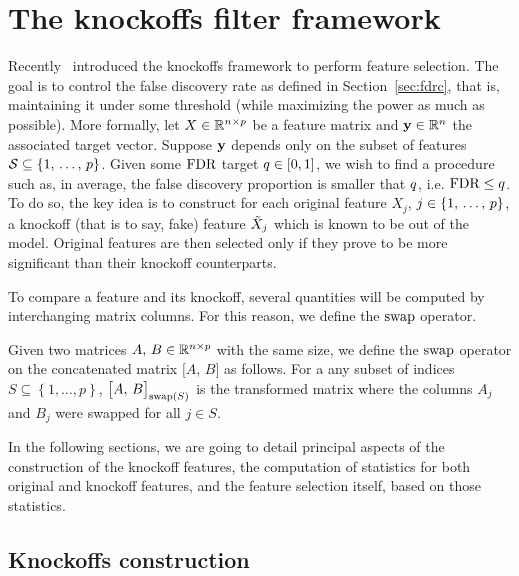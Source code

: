 \chapter{The knockoffs filter framework}\label{ch:knockoffs}

Recently~\cite{fixed_x_knockoffs} introduced the knockoffs framework to perform feature selection.
The goal is to control the false discovery rate as defined in Section~\ref{sec:fdrc},
that is, maintaining it under some threshold
(while maximizing the power as much as possible).
More formally, let $X \in \mathbb{R}^{n \times p}$ be a feature matrix and $\mathbf{y} \in \mathbb{R}^n$ the associated target vector.
Suppose $\mathbf{y}$ depends only on the subset of features $\mathcal{S} \subseteq \left\{ 1,\, \dots,\, p \right\}$.
Given some $\text{FDR}$ target $q \in [0, 1]$, we wish to find a procedure such as, in average,
the false discovery proportion is smaller that $q$, i.e. $\text{FDR} \leq q$.
To do so, the key idea is to construct for each original feature $X_j$, $j \in \left\{ 1,\, \dots,\, p \right\}$,
a knockoff (that is to say, fake) feature $\tilde{X}_j$ which is known to be out of the model.
Original features are then selected only if they prove to be more significant than their knockoff counterparts.

To compare a feature and its knockoff, several quantities will be computed by interchanging matrix columns.
For this reason, we define the $\operatorname{swap}$ operator.
\begin{definition}\label{def:swap}
    Given two matrices $A,\,B \in \mathbb{R}^{n \times p}$ with the same size,
    we define the $\operatorname{swap}$ operator on the concatenated matrix $\big[ A,\, B \big]$ as follows.
    For a any subset of indices $S \subseteq \left\{ 1, \dots, p \right\}$,
    $\big[ A,\, B \big]_{\operatorname{swap}(S)}$ is the transformed matrix where the columns $A_j$ and $B_j$ were swapped for all
    $j \in S$.
\end{definition}

In the following sections, we are going to detail principal aspects of the construction of the knockoff features,
the computation of statistics for both original and knockoff features,
and the feature selection itself, based on those statistics.

\section{Knockoffs construction}\label{sec:kc}


